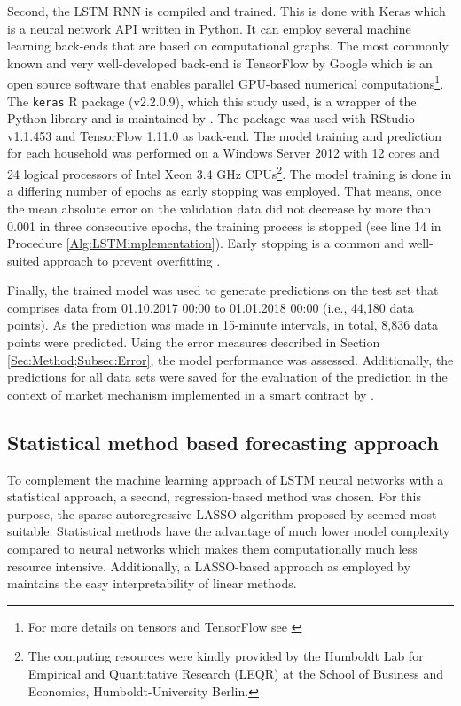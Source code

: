 %
Second, the LSTM RNN is compiled and trained. This is done with Keras which is a neural network API written in Python. It can employ several machine learning back-ends that are based on computational graphs. The most commonly known and very well-developed back-end is TensorFlow by Google which is an open source software that enables parallel GPU-based numerical computations\footnote{For more details on tensors and TensorFlow see \citet{Abadi:2017, Goldsborough:2016}}. The \texttt{keras} R package (v2.2.0.9), which this study used, is a wrapper of the Python library and is maintained by \citet{chollet:2017kerasR}. The package was used with RStudio v1.1.453 and TensorFlow 1.11.0 as back-end. The model training and prediction for each household was performed on a Windows Server 2012 with 12 cores and 24 logical processors of Intel Xeon 3.4 GHz CPUs\footnote{The computing resources were kindly provided by the Humboldt Lab for Empirical and Quantitative Research (LEQR) at the School of Business and Economics, Humboldt-University Berlin.}. The model training is done in a differing number of epochs as early stopping was employed. That means, once the mean absolute error on the validation data did not decrease by more than 0.001 in three consecutive epochs, the training process is stopped (see line 14 in Procedure \ref{Alg:LSTMimplementation}). Early stopping is a common and well-suited approach to prevent overfitting \citep{chollet:2018}.

Finally, the trained model was used to generate predictions on the test set that comprises data from 01.10.2017 00:00 to 01.01.2018 00:00 (i.e., 44,180 data points). As the prediction was made in 15-minute intervals, in total, 8,836 data points were predicted. Using the error measures described in Section \ref{Sec:Method;Subsec:Error}, the model performance was assessed. Additionally, the predictions for all data sets were saved for the evaluation of the prediction in the context of market mechanism implemented in a smart contract by \citet{Mengelkamp:2018a}.


\subsection{Statistical method based forecasting approach} \label{Sec:Method;Subsec:LASSO}

To complement the machine learning approach of LSTM neural networks with a statistical approach, a second, regression-based method was chosen. For this purpose, the sparse autoregressive LASSO algorithm proposed by \citet{Li:2017} seemed most suitable. Statistical methods have the advantage of much lower model complexity compared to neural networks which makes them computationally much less resource intensive. Additionally, a LASSO-based approach as employed by \citet{Li:2017} maintains the easy interpretability of linear methods.



